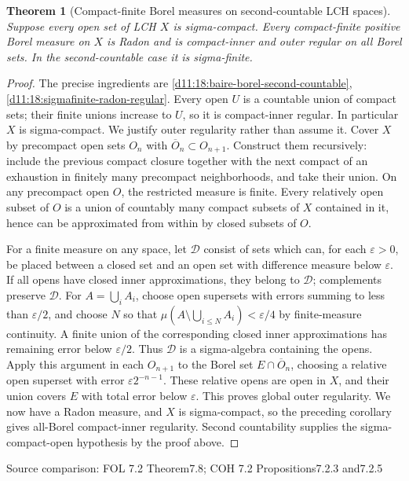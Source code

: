 \documentclass[11pt,oneside,openany]{book}
\newtheorem{theorem}{Theorem}[chapter]
\theoremstyle{definition}
\theoremstyle{remark}
\newcommand{\eps}{\varepsilon}\newcommand{\ee}{\varepsilon}
\newcommand{\family}[1]{}
\newcommand{\source}[1]{\par\begingroup\small\sffamily\color{black!65}Source comparison: #1\par\endgroup}
\begin{document}
\begin{theorem}[Compact-finite Borel measures on second-countable LCH spaces]\family{D11.18.second_countable_borel_regular}\label{d11:18:second-countable-borel-regular}
Suppose every open set of LCH $X$ is sigma-compact. Every compact-finite positive Borel measure on $X$ is Radon and is compact-inner and outer regular on all Borel sets. In the second-countable case it is sigma-finite.
\end{theorem}
\begin{proof}
The precise ingredients are \cref{d11:18:baire-borel-second-countable}, \cref{d11:18:sigmafinite-radon-regular}. Every open $U$ is a countable union of compact sets; their finite unions increase to $U$, so it is compact-inner regular. In particular $X$ is sigma-compact. We justify outer regularity rather than assume it. Cover $X$ by precompact open sets $O_n$ with $\overline O_n\subset O_{n+1}$. Construct them recursively: include the previous compact closure together with the next compact of an exhaustion in finitely many precompact neighborhoods, and take their union. On any precompact open $O$, the restricted measure is finite. Every relatively open subset of $O$ is a union of countably many compact subsets of $X$ contained in it, hence can be approximated from within by closed subsets of $O$.

For a finite measure on any space, let $\mathcal D$ consist of sets which can, for each $\eps>0$, be placed between a closed set and an open set with difference measure below $\eps$. If all opens have closed inner approximations, they belong to $\mathcal D$; complements preserve $\mathcal D$. For $A=\bigcup_i A_i$, choose open supersets with errors summing to less than $\eps/2$, and choose $N$ so that $\mu(A\setminus\bigcup_{i\le N}A_i)<\eps/4$ by finite-measure continuity. A finite union of the corresponding closed inner approximations has remaining error below $\eps/2$. Thus $\mathcal D$ is a sigma-algebra containing the opens. Apply this argument in each $O_{n+1}$ to the Borel set $E\cap\overline O_n$, choosing a relative open superset with error $\eps2^{-n-1}$. These relative opens are open in $X$, and their union covers $E$ with total error below $\eps$. This proves global outer regularity. We now have a Radon measure, and $X$ is sigma-compact, so the preceding corollary gives all-Borel compact-inner regularity. Second countability supplies the sigma-compact-open hypothesis by the proof above.
\end{proof}
\source{FOL 7.2 Theorem7.8; COH 7.2 Propositions7.2.3 and7.2.5}
\end{document}
